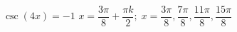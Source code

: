 { $\csc \left( 4x \right) = -1$}
{ $x = \dfrac{3\pi}{8} + \dfrac{\pi k}{2}; \; x = \dfrac{3\pi}{8}, \dfrac{7\pi}{8}, \dfrac{11\pi}{8}, \dfrac{15\pi}{8}$}
